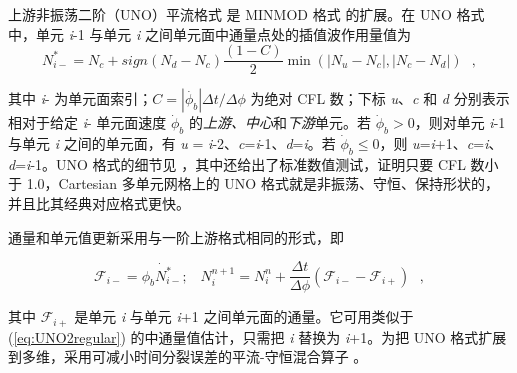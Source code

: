 
\vspace{\baselineskip} 
\vspace{\baselineskip} 


\noindent
上游非振荡二阶（UNO）平流格式 \citep{art:Li08} 是 MINMOD 格式 \citep{art:Roe86} 的扩展。在 UNO 格式中，单元 \emph{i}-1 与单元 \emph{i} 之间单元面中通量点处的插值波作用量值为
\begin{equation}
N_{i-}^{*}=N_{c}+sign\left(N_{d}-N_{c}\right)\frac{\left(1-C\right)}{2}\min\left(|N_{u}-N_{c}|,|N_{c}-N_{d}|\right) \:\:\: ,
\label{eq:UNO2regular}
\end{equation}

\noindent
其中 \emph{i}- 为单元面索引；$C=\left|\dot{\phi_{b}}\right|\Delta t/\Delta\phi$ 为绝对 CFL 数；下标 \emph{u}、\emph{c} 和 \emph{d} 分别表示相对于给定 \emph{i}- 单元面速度 $\dot{\phi}_{b}$ 的\emph{上游、中心}和\emph{下游}单元。若 $\dot{\phi}_{b}>0$，则对单元 \emph{i}-1 与单元 \emph{i} 之间的单元面，有 \emph{u} = \emph{i}-2、\emph{c}=\emph{i}-1、\emph{d}=\emph{i}。若 $\dot{\phi}_{b}\leq0$，则 \emph{u}=\emph{i}+1、\emph{c}=\emph{i}、\emph{d}=\emph{i}-1。UNO 格式的细节见 \cite{art:Li08}，其中还给出了标准数值测试，证明只要 CFL 数小于 1.0，Cartesian 多单元网格上的 UNO 格式就是非振荡、守恒、保持形状的，并且比其经典对应格式更快。

通量和单元值更新采用与一阶上游格式相同的形式，即

\begin{equation}
\mathcal{F}_{i-}=\dot{\phi_{b}N_{i-}^{*}};\;\;\; N_{i}^{n+1}=N_{i}^{n}+\frac{\Delta t}{\Delta\phi}\left(\mathcal{F}_{i-}-\mathcal{F}_{i+}\right) \:\:\: ,
\end{equation}
 
\noindent
其中 $\mathcal{F}_{i+}$ 是单元 \emph{i} 与单元 \emph{i}+1 之间单元面的通量。它可用类似于 (\ref{eq:UNO2regular}) 的中通量值估计，只需把 \emph{i} 替换为 \emph{i}+1。为把 UNO 格式扩展到多维，采用可减小时间分裂误差的平流-守恒混合算子 \citep{art:LLM96}。

